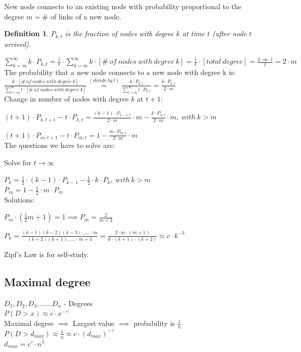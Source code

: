 \documentclass[12pt]{scrartcl}
\newtheorem{defi}{Definition}
\begin{document}
New node connects to an existing node with probability proportional to the degree $m = \#$ of links of a new node.
\begin{defi}
	$P_{k,t}$ is the fraction of nodes with degree $k$ at time 	$t$ (after node $t$ arrived).
\end{defi}

$\sum\limits_{k=m}^\infty k\cdot P_{k,t} = \frac{1}{t}\cdot \sum\limits_{k=m}^\infty k\cdot [\#\ of\ nodes\ with\ degree\ k] = \frac{1}{t}\cdot [total\ degree] = \frac{2\cdot m\cdot t}{t} = 2\cdot m$\\

\noindent The probability that a new node connects to a new node with degree k is:\\

$\frac{k\cdot [\#\ of\ nodes\ with\ degree\ k]}{\sum\limits_{l=m}^\infty l\cdot [\#\ of\ nodes\ with\ degree\ k]} \stackrel{(divide\ by\ t)}{=} \frac{k\cdot P_{k,t}}{\sum\limits_{l=m}^\infty l\cdot P_{k,t}} = \frac{k\cdot P_{k,t}}{2\cdot m}$\\

\noindent Change in number of nodes with degree $k$ at $t+1$:

$(t+1)\cdot P_{k,t+1} - t\cdot P_{k,t} = \frac{(k-1)\cdot P_{k-1,t}}{2\cdot m}\cdot m - \frac{k\cdot P_{k,t}}{2\cdot m}\cdot m,\ with\ k>m$

$(t+1)\cdot P_{m,t+1} - t\cdot P_{m,t} = 1 - \frac{m\cdot P_{m,t}}{2\cdot m}\cdot m$\\

\noindent The questions we have to solve are:

Solve for $t \rightarrow \infty$

$P_{k} = \frac{1}{2}\cdot (k-1)\cdot P_{k-1} - \frac{1}{2}\cdot k\cdot P_{k},\ with\ k>m$\\
\indent $P_{m} = 1 - \frac{1}{2}\cdot m\cdot P_{m}$\\


\noindent Solutions:

\indent $P_{m}\cdot (\frac{1}{2} m + 1) = 1 \implies P_{m} = \frac{2}{m + 2}$

\indent $P_{k} = \frac{(k-1)(k-2)(k-3)\dotsc \dotsc \cdot m}{(k+2)(k+1)\dotsc \dotsc \cdot m +3} = \frac{2\cdot m\cdot (m+1)}{
k\cdot (k+1)\cdot (k+2)
}
\approx c\cdot k^{-3}$\newline

\noindent Zipf's Law is for self-study.

\subsection{Maximal degree}
$D_{1},D_{2},D_{3},\dotsc \dotsc D_{n}$ - Degrees\\
$P(D>x) \approx c\cdot x^{-\gamma}$\\
Maximal degree $\implies$ Largest value $\implies$ probability is $\frac{1}{n}$\\
$P(D>d_{max}) \approx \frac{1}{n} \approx c\cdot (d_{max})^{-\gamma}$\\
$d_{max} = c'\cdot n^{\frac{1}{\gamma}}$\\
\end{document}
